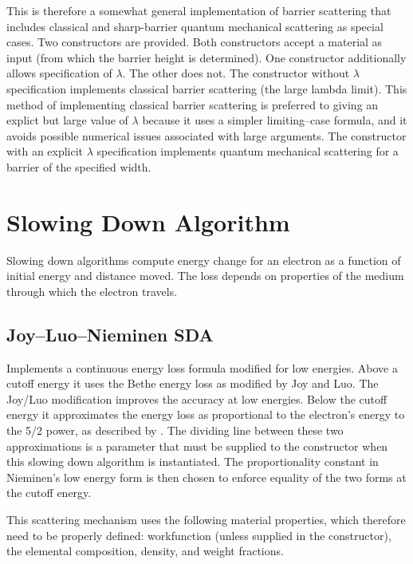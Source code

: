 This is therefore a somewhat general implementation of barrier scattering that includes classical and sharp-barrier quantum mechanical scattering as special cases. Two constructors are provided. Both constructors accept a material as input (from which the barrier height is determined). One constructor additionally allows specification of $\lambda$. The other does not. The constructor without $\lambda$ specification implements classical barrier scattering (the large lambda limit). This method of implementing classical barrier scattering is preferred to giving an explict but large value of $\lambda$ because it uses a simpler limiting--case formula, and it avoids possible numerical issues associated with large arguments. The constructor with an explicit $\lambda$ specification implements quantum mechanical scattering for a barrier of the specified width.

\section{Slowing Down Algorithm}\label{con:sda}
Slowing down algorithms compute energy change for an electron as a function of initial energy and distance moved. The loss depends on properties of the medium through which the electron travels.
 
\subsection{Joy--Luo--Nieminen SDA}
Implements a continuous energy loss formula modified for low energies. Above a cutoff energy it uses the Bethe energy loss as modified by Joy and Luo. The Joy/Luo modification improves the accuracy at low energies. Below the cutoff energy it approximates the energy loss as proportional to the electron's energy to the 5/2 power, as described by \cite{Nieminen}. The dividing line between these two approximations is a parameter that must be supplied to the constructor when this slowing down algorithm is instantiated. The proportionality constant in Nieminen's low energy form is then chosen to enforce equality of the two forms at the cutoff energy.

This scattering mechanism uses the following material properties, which therefore need to be properly defined: workfunction (unless supplied in the constructor), the elemental composition, density, and weight fractions.